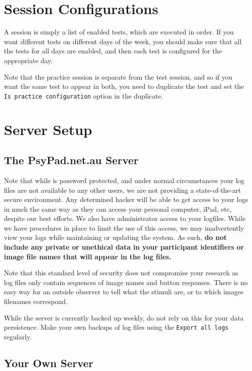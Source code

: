 \documentclass{article}
\begin{document}
\section{Session Configurations}
\label{sec-configs}

A session is simply a list of enabled tests, which are executed in
order. If you want different tests on different days of the week,
you should make sure that all the tests for all days are enabled,
and then each test is configured for the appropriate day.

Note that the practice session is separate from the test session,
and so if you want the same test to appear in both, you need to
duplicate the test and set the {\tt Is practice configuration} option in the duplicate.

\section{Server Setup}
\label{sec-server}

\subsection{The PsyPad.net.au Server}

Note that while  is password protected, and under 
normal circumstances
your log files are not available to any other users, we are not providing
a state-of-the-art secure environment. Any determined hacker will be able to 
get access to your logs in much the same way as they 
can access your personal computer,
iPad, etc, despite our best efforts.
We also have administrator access to your logfiles. 
While we have procedures in place to
limit the use of this access, we may inadvertently view 
your logs while maintaining or
updating the system. 
As such, {\bf do not include any private or unethical data in
your participant identifiers or image file names 
that will appear in the log files.}

Note that this standard level of security does not compromise your
research as log files only contain sequences of image names and
button responses. There is no easy way for an outside observer 
to tell what the stimuli are, or
to which images filenames correspond.

While the server is currently backed up weekly, do not rely on this for your
data persistence.
Make your own backups of log files using the {\tt Export all logs} 
regularly. 

\subsection{Your Own Server}
\label{sec-ownserver}
\end{document}
